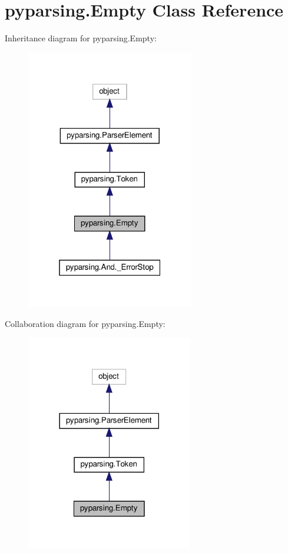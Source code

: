 \hypertarget{classpyparsing_1_1Empty}{}\section{pyparsing.\+Empty Class Reference}
\label{classpyparsing_1_1Empty}


Inheritance diagram for pyparsing.\+Empty\+:
\nopagebreak
\begin{figure}[H]
\begin{center}
\leavevmode
\includegraphics[width=208pt]{classpyparsing_1_1Empty__inherit__graph}
\end{center}
\end{figure}


Collaboration diagram for pyparsing.\+Empty\+:
\nopagebreak
\begin{figure}[H]
\begin{center}
\leavevmode
\includegraphics[width=206pt]{classpyparsing_1_1Empty__coll__graph}
\end{center}
\end{figure}
